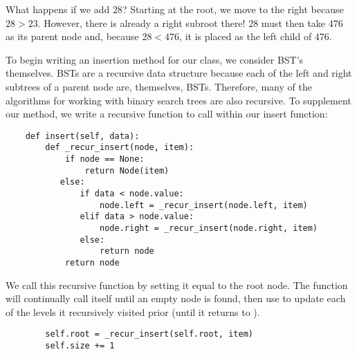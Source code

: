 \begin{minipage}{0.4\textwidth}
\end{minipage}\hfill
\begin{minipage}{0.6\textwidth}
    What happens if we add $28$? Starting at the root, we move to the right because $28 > 23$.
    However, there is already a right subroot there!
    $28$ must then take $476$ as its parent node and, because $28 < 476$, it is placed as the left child of $476$.
\end{minipage}

To begin writing an insertion method for our  class, we consider BST's themselves.
BSTs are a recursive data structure because each of the left and right subtrees of a parent node are, themselves, BSTs.
Therefore, many of the algorithms for working with binary search trees are also recursive.
To supplement our  method, we write a recursive function to call within our insert function:
\begin{lstlisting}
    def insert(self, data):
        def _recur_insert(node, item):
            if node == None:
                return Node(item)
           else:
               if data < node.value:
                   node.left = _recur_insert(node.left, item)
               elif data > node.value:
                   node.right = _recur_insert(node.right, item)
               else:
                   return node
            return node
\end{lstlisting}
We call this recursive function by setting it equal to the root node.
The function will continually call itself until an empty node is found, then use  to update each of the levels it recursively visited prior (until it returns to ).
\begin{lstlisting}
        self.root = _recur_insert(self.root, item)
        self.size += 1
\end{lstlisting}


